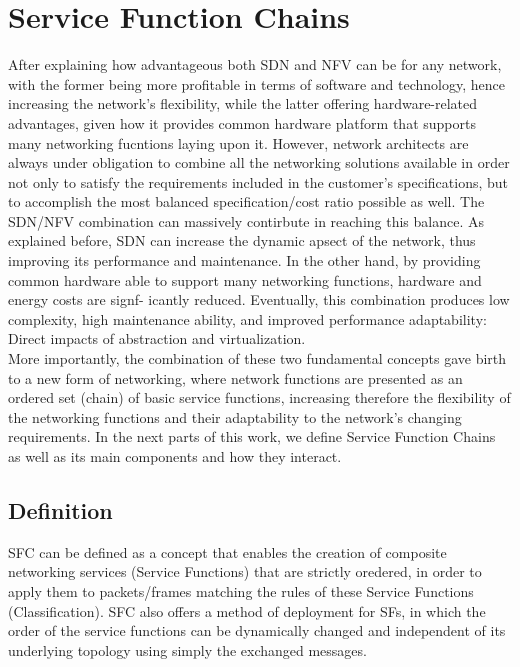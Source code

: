 \section{Service Function Chains}
After explaining how advantageous both SDN and NFV can be for any network, with the former being more profitable in terms of software and technology, hence increasing the network’s flexibility, while the latter offering hardware-related advantages, given how it provides common hardware
platform that supports many networking fucntions laying upon it. However, network architects are always under obligation to combine all the networking solutions available in order not only to satisfy the requirements included in the customer’s specifications, but to accomplish the most balanced specification/cost ratio possible as well. The SDN/NFV combination can massively contirbute in reaching this balance. As explained before, SDN can increase the dynamic apsect of the network, thus improving its performance and maintenance. In the other hand, by providing common hardware able to support many networking functions, hardware and energy costs are signf-
icantly reduced. Eventually, this combination produces low complexity, high maintenance ability, and improved performance adaptability: Direct impacts of abstraction and virtualization.\\
More importantly, the combination of these two fundamental concepts gave birth to a new form of networking, where network functions are presented as an ordered set (chain) of basic service functions, increasing therefore the flexibility of the networking functions and their adaptability to the network’s changing requirements. In the next parts of this work, we define Service Function Chains as well as its main components and how they interact.
\subsection{Definition}
SFC can be defined as a concept that enables the creation of composite networking services (Service Functions) that are strictly oredered, in order to apply them to packets/frames matching the rules of these Service Functions
(Classification). SFC also offers a method of deployment for SFs, in which the order of the service functions can be dynamically changed and independent of its underlying topology using simply the exchanged messages.
